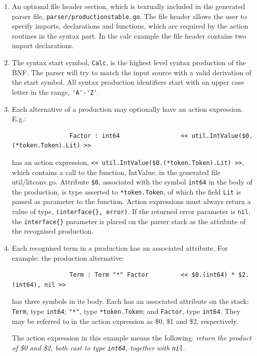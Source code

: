 \documentclass[12pt]{article}
\begin{document}
		\begin{enumerate}
			\item An optional file header section, which is textually included in the generated parser file, \verb|parser/productionstable.go|. The file header allows the user to specify imports, declarations and functions, which are required by the action routines in the syntax part. In the calc example the file header contains two import declarations.

			\item The syntax start symbol, \verb|Calc|, is the highest level syntax production of the BNF. The parser will try to match the input source with a valid derivation of the start symbol. All syntax production identifiers start with an upper case letter in the range, \verb|'A'-'Z'|.

			\item Each alternative of a production may optionally have an action expression. E.g.:

			\begin{verbatim}
				Factor : int64                 << util.IntValue($0.(*token.Token).Lit) >>
			\end{verbatim}

			has an action expression, \verb|<< util.IntValue($0.(*token.Token).Lit) >>|, which contains a call to the function, IntValue, in the generated file util/litconv.go. Attribute \verb|$0|, associated with the symbol \verb|int64| in the body of the production, is type asserted to \verb|*token.Token|, of which the field \verb|Lit| is passed as parameter to the function.
			Action expressions must always return a value of type, \verb|(interface{}, error)|. If the returned error parameter is \verb|nil|, the \verb|interface{}| parameter is placed on the parser stack as the attribute of the recognised production.

			\item Each recognised term in a production has an associated attribute. For example: the production alternative:

			\begin{verbatim}
				Term : Term "*" Factor         << $0.(int64) * $2.(int64), nil >>
			\end{verbatim}

			has three symbols in its body. Each has an associated attribute on the stack: \verb|Term|, type \verb|int64|; \verb|"*"|, type \verb|*token.Token|; and \verb|Factor|, type \verb|int64|. They may be referred to in the action expression as \$0, \$1 and \$2, respectively.

			The action expression in this example means the following: {\em return the product of \$0 and \$2, both cast to type \verb|int64|, together with \verb|nil|.}
		\end{enumerate}
\end{document}
